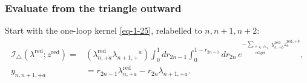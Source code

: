 \documentclass[11pt]{article}
\numberwithin{equation}{section}
\numberwithin{figure}{section}
\numberwithin{table}{section}
\begin{document}
\subsubsection{Evaluate from the triangle outward}\label{local-B4-restore-heading}

Start with the one-loop kernel \eqref{eq-1-25}, relabelled to $n,n+1,n+2$:
\begin{equation}\label{eq-B-fan-second-merge}
\begin{aligned}
\mathcal I_\triangle(\lambda^{\mathrm{red}};z^{\mathrm{red}})
={}&(\lambda_{n,+\dot a}^{\mathrm{red}}\lambda_{n+1,+}{}^{\dot a})
\int_0^1dr_{2n-1}\int_0^{1-r_{2n-1}}dr_{2n}\,
e^{-\sum_{\substack{e\in\triangle_1\\\mathrm{edges}}}y_{e,+\dot b}^{\mathrm{red}}z_e^{\mathrm{red},+\dot b}},\\
y_{n,n+1,+\dot a}&=r_{2n-1}\lambda_{n,+\dot a}^{\mathrm{red}}
-r_{2n}\lambda_{n+1,+\dot a}.
\end{aligned}
\end{equation}
\end{document}
